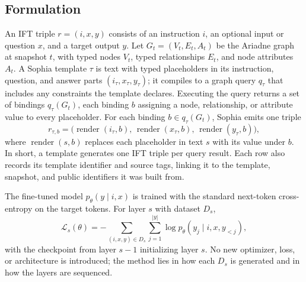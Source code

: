 \documentclass[conference]{IEEEtran}
\begin{document}
\subsection{Formulation}
An IFT triple $r=(i,x,y)$ consists of an instruction $i$, an optional input or question $x$, and a target output $y$. Let $G_t=(V_t,E_t,A_t)$ be the Ariadne graph at snapshot $t$, with typed nodes $V_t$, typed relationships $E_t$, and node attributes $A_t$. A Sophia template $\tau$ is text with typed placeholders in its instruction, question, and answer parts $(i_\tau,x_\tau,y_\tau)$; it compiles to a graph query $q_\tau$ that includes any constraints the template declares. Executing the query returns a set of bindings $q_\tau(G_t)$, each binding $b$ assigning a node, relationship, or attribute value to every placeholder. For each binding $b\in q_\tau(G_t)$, Sophia emits one triple
\begin{equation}
 r_{\tau,b}=\big(\operatorname{render}(i_\tau,b),\,\operatorname{render}(x_\tau,b),\,\operatorname{render}(y_\tau,b)\big),
\end{equation}
where $\operatorname{render}(s,b)$ replaces each placeholder in text $s$ with its value under $b$. In short, a template generates one IFT triple per query result. Each row also records its template identifier and source tags, linking it to the template, snapshot, and public identifiers it was built from.

The fine-tuned model $p_\theta(y\mid i,x)$ is trained with the standard next-token cross-entropy on the target tokens. For layer $s$ with dataset $D_s$,
\begin{equation}
 \mathcal{L}_s(\theta)=-\sum_{(i,x,y)\in D_s}\sum_{j=1}^{|y|}\log p_\theta(y_j\mid i,x,y_{<j}),
\end{equation}
with the checkpoint from layer $s-1$ initializing layer $s$. No new optimizer, loss, or architecture is introduced; the method lies in how each $D_s$ is generated and in how the layers are sequenced.
\end{document}
